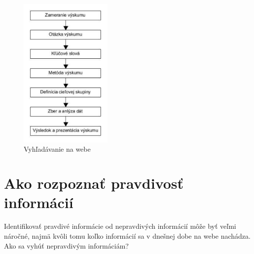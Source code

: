 \documentclass[10pt,twoside,slovak,a4paper]{article}
\begin{document}
\begin{figure}
    \centering
    \includegraphics[width=0.4\textwidth]{tabulka1.pdf}
    \caption{Vyhľadávanie na webe}
    \label{obr1}
\end{figure}

\section{Ako rozpoznať pravdivosť informácií}
\label{pravdivost}
Identifikovať pravdivé informácie od  nepravdivých informácií môže byť veľmi náročné, najmä kvôli tomu koľko informácií sa v dnešnej dobe na webe nachádza. Ako sa vyhúť nepravdivým informáciám? \cite{de2021approaches}
\end{document}
